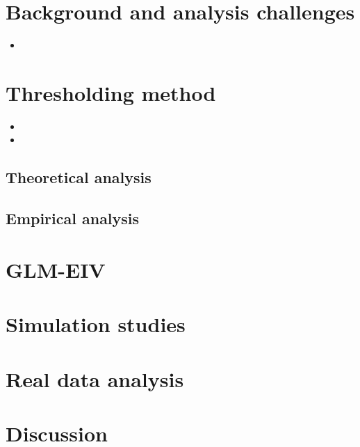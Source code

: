 \documentclass[12pt]{article}
\begin{document}
	
\section{Background and analysis challenges}

\begin{itemize}
\item 
\end{itemize}

\section{Thresholding method}

\begin{itemize}
\item 
\item 
\end{itemize}

\subsection{Theoretical analysis}

\subsection{Empirical analysis}

\section{GLM-EIV}

\section{Simulation studies}

\section{Real data analysis}

\section{Discussion}
\end{document}
